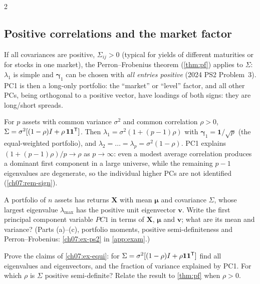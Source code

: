 \begin{paracol}{2}
\subsection{Positive correlations and the market factor}\label{ch07:sec-pf}
If all covariances are positive, $\Sigma_{ij}>0$ (typical for yields of different maturities or for stocks in
one market), the Perron--Frobenius theorem (\cref{thm:pf}) applies to $\Sigma$: $\lambda_1$ is simple and
$\bm\gamma_1$ can be chosen with \emph{all entries positive} (2024 PS2 Problem~3). PC1 is then a long-only
portfolio: the ``market'' or ``level'' factor, and all other PCs, being orthogonal to a positive vector,
have loadings of both signs: they are long/short spreads.

\begin{example}\label{ch07:ex-equi}
For $p$ assets with common variance $\sigma^2$ and common correlation $\rho>0$,
$\Sigma=\sigma^2[(1-\rho)I+\rho\,\bm 1\bm 1^{\mathsf T}]$. Then $\lambda_1=\sigma^2(1+(p-1)\rho)$ with $\bm\gamma_1=\bm1/\sqrt p$ (the
equal-weighted portfolio), and $\lambda_2=\dots=\lambda_p=\sigma^2(1-\rho)$. PC1 explains
$(1+(p-1)\rho)/p\to\rho$ as $p\to\infty$: even a modest average correlation produces a dominant first
component in a large universe, while the remaining $p-1$ eigenvalues are degenerate, so the individual
higher PCs are not identified (\cref{ch07:rem-sign}).
\end{example}

\begin{exercise}\label{ch07:ex-ps2-short}
A portfolio of $n$ assets has returns $\bm X$ with mean $\bm\mu$ and covariance $\Sigma$, whose largest eigenvalue $\lambda_{\max}$ has the positive unit eigenvector $\bm v$. Write the first principal component variable $PC1$ in terms of $\bm X$, $\bm\mu$ and $\bm v$; what are its mean and variance? (Parts (a)--(c), portfolio moments, positive semi-definiteness and Perron--Frobenius: \cref{ch07:ex-ps2} in \cref{app:exam}.)
\end{exercise}

\begin{exercise}\label{ch07:ex-equi-proof}
Prove the claims of \cref{ch07:ex-equi}: for $\Sigma=\sigma^2[(1-\rho)I+\rho\bm1\bm1^{\mathsf T}]$ find all eigenvalues and eigenvectors, and
the fraction of variance explained by PC1. For which $\rho$ is $\Sigma$ positive semi-definite? Relate the result to
\cref{thm:pf} when $\rho>0$.
\end{exercise}


\end{paracol}
